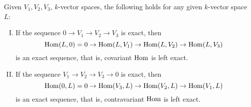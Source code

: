 \begin{proposition}
  Given \(V_1, V_2, V_3\), \(k\)-vector spaces, the following holds for any
  given \(k\)-vector space \(L\):
  \begin{enumerate}[I.]
    \item If the sequence \(0 \to V_1 \to V_2 \to V_3\) is exact, then 
      \[
          \operatorname{Hom}(L, 0) = 0 \to \operatorname{Hom}(L, V_1) \to \operatorname{Hom}(L, V_2) \to \operatorname{Hom}(L, V_3)
      \] 
      is an exact sequence, that is, covariant \(\operatorname{Hom}\) is left exact.
    \item If the sequence \(V_1 \to V_2 \to V_3 \to 0\) is exact, then 
      \[
          \operatorname{Hom}(0, L) = 0 \to \operatorname{Hom}(V_3, L) \to \operatorname{Hom}(V_2, L) \to \operatorname{Hom}(V_1, L)
      \] 
      is an exact sequence, that is, contravariant \(\operatorname{Hom}\) is left exact.
  \end{enumerate}
\end{proposition}

